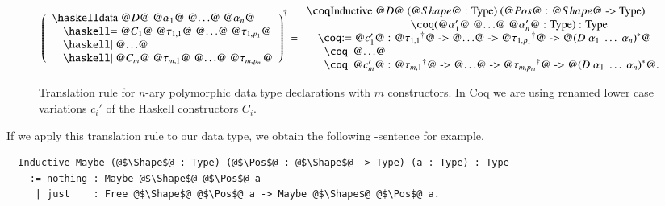 \begin{figure}[H]
  \[
    \toCoq{\left(
      \begin{array}{ll}
        \haskellM{data @$D$@ @$\alpha_1$@ @$\ldots$@ @$\alpha_n$@}              \\
          \quad\haskellM{= @$C_1$@ @$\tau_{1,1}$@ @$\ldots$@  @$\tau_{1,p_1}$@} \\
          \quad\haskellM{| @$\ldots$@}                                          \\
          \quad\haskellM{| @$C_m$@ @$\tau_{m,1}$@ @$\ldots$@  @$\tau_{m,p_m}$@}
      \end{array}
    \right)}
    = \begin{array}{l}
      \coqM{Inductive @$D$@ (@$\Shape$@ : Type) (@$\Pos$@ : @$\Shape$@ -> Type)}                      \\
      \phantom{\coqM{Inductive @$D$@}}\;\;\coqM{(@$\alpha_1'$@ @$\ldots$@ @$\alpha_n'$@ : Type) : Type} \\
      \quad\coqM{:= @$c_1'$@ : @$\toCoqX{\tau_{1,1}}$@ -> @$\ldots$@ -> @$\toCoqX{\tau_{1,p_1}}$@ -> @$\toCoqTX{(D\;\alpha_1\;\ldots\;\alpha_n)}$@} \\
      \quad\;\;\coqM{| @$\ldots$@}                                                                                                                             \\
      \quad\;\;\coqM{| @$c_m'$@ : @$\toCoqX{\tau_{m,1}}$@ -> @$\ldots$@ -> @$\toCoqX{\tau_{m,p_m}}$@ -> @$\toCoqTX{(D\;\alpha_1\;\ldots\;\alpha_n)}$@.}
    \end{array}
  \]
  \caption{Translation rule for $n$-ary polymorphic data type declarations with $m$ constructors. In Coq we are using renamed lower case variations $c_i'$ of the Haskell constructors $C_i$.}
  \label{fig:translation:type-decl:data}
\end{figure}

If we apply this translation rule to our  data type, we obtain the following -sentence for example.
\begin{verbatim}
  Inductive Maybe (@$\Shape$@ : Type) (@$\Pos$@ : @$\Shape$@ -> Type) (a : Type) : Type
    := nothing : Maybe @$\Shape$@ @$\Pos$@ a
     | just    : Free @$\Shape$@ @$\Pos$@ a -> Maybe @$\Shape$@ @$\Pos$@ a.
\end{verbatim}

